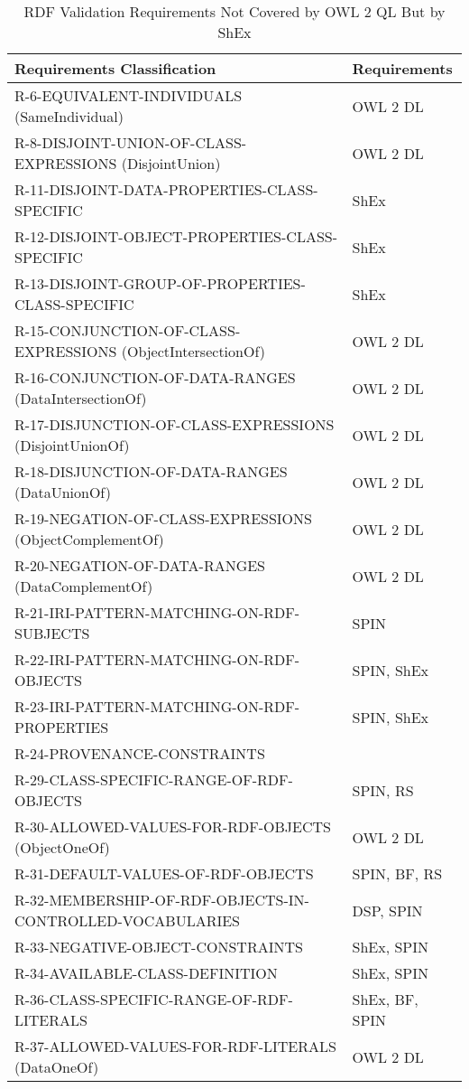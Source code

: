 \documentclass{llncs}
\newcommand{\hr}{\hline\noalign{\smallskip}} %
\begin{document}
\begin{table}
\caption{RDF Validation Requirements Not Covered by OWL 2 QL But by ShEx}
\label{tab:RequirementsCoveredShEx}
\centering
\begin{tabular}{ll}
\hr
Requirements Classification & Requirements \\
\hr
R-6-EQUIVALENT-INDIVIDUALS (SameIndividual) & OWL 2 DL \\
R-8-DISJOINT-UNION-OF-CLASS-EXPRESSIONS (DisjointUnion) & OWL 2 DL \\
R-11-DISJOINT-DATA-PROPERTIES-CLASS-SPECIFIC & ShEx \\
R-12-DISJOINT-OBJECT-PROPERTIES-CLASS-SPECIFIC & ShEx \\
R-13-DISJOINT-GROUP-OF-PROPERTIES-CLASS-SPECIFIC & ShEx \\
R-15-CONJUNCTION-OF-CLASS-EXPRESSIONS (ObjectIntersectionOf) & OWL 2 DL \\
R-16-CONJUNCTION-OF-DATA-RANGES (DataIntersectionOf) & OWL 2 DL \\
R-17-DISJUNCTION-OF-CLASS-EXPRESSIONS (DisjointUnionOf) & OWL 2 DL \\
R-18-DISJUNCTION-OF-DATA-RANGES (DataUnionOf) & OWL 2 DL \\
R-19-NEGATION-OF-CLASS-EXPRESSIONS (ObjectComplementOf) & OWL 2 DL \\
R-20-NEGATION-OF-DATA-RANGES (DataComplementOf) & OWL 2 DL \\
R-21-IRI-PATTERN-MATCHING-ON-RDF-SUBJECTS & SPIN \\
R-22-IRI-PATTERN-MATCHING-ON-RDF-OBJECTS & SPIN, ShEx \\
R-23-IRI-PATTERN-MATCHING-ON-RDF-PROPERTIES & SPIN, ShEx \\
R-24-PROVENANCE-CONSTRAINTS & \\
R-29-CLASS-SPECIFIC-RANGE-OF-RDF-OBJECTS & SPIN, RS \\
R-30-ALLOWED-VALUES-FOR-RDF-OBJECTS (ObjectOneOf) & OWL 2 DL \\
R-31-DEFAULT-VALUES-OF-RDF-OBJECTS & SPIN, BF, RS \\
R-32-MEMBERSHIP-OF-RDF-OBJECTS-IN-CONTROLLED-VOCABULARIES & DSP, SPIN \\
R-33-NEGATIVE-OBJECT-CONSTRAINTS & ShEx, SPIN \\
R-34-AVAILABLE-CLASS-DEFINITION & ShEx, SPIN \\
R-36-CLASS-SPECIFIC-RANGE-OF-RDF-LITERALS & ShEx, BF, SPIN \\
R-37-ALLOWED-VALUES-FOR-RDF-LITERALS (DataOneOf) & OWL 2 DL \\

\end{tabular}
\end{table}
\end{document}
